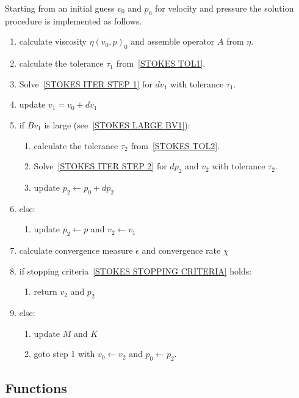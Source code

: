 Starting from an initial guess $v_{0}$ and $p_{0}$ for velocity and pressure
the solution procedure is implemented as follows.
\begin{enumerate}
 \item calculate viscosity $\eta(v_{0},p)_{0}$ and assemble operator $A$ from $\eta$.
 \item calculate the tolerance $\tau_{1}$ from~\ref{STOKES TOL1}.
 \item Solve~\ref{STOKES ITER STEP 1} for $dv_{1}$ with tolerance $\tau_{1}$.
 \item update $v_{1}= v_{0}+ dv_{1}$
 \item if $Bv_{1}$ is large (see~\ref{STOKES LARGE BV1}):
 \begin{enumerate}
 \item calculate the tolerance $\tau_{2}$ from~\ref{STOKES TOL2}.
 \item Solve~\ref{STOKES ITER STEP 2} for $dp_{2}$ and $v_{2}$ with tolerance $\tau_{2}$.
 \item update $p_{2}\leftarrow p_{0}+ dp_{2}$
 \end{enumerate}
 \item else:
  \begin{enumerate}
  \item update $p_{2}\leftarrow p$ and $v_{2}\leftarrow v_{1}$
   \end{enumerate}
   \item calculate convergence measure $\epsilon$ and convergence rate $\chi$
\item if stopping criteria~\ref{STOKES STOPPING CRITERIA} holds:
 \begin{enumerate}
 \item return $v_{2}$ and $p_{2}$
 \end{enumerate}
 \item else:
 \begin{enumerate}

     \item update $M$ and $K$
     \item goto step 1 with $v_{0}\leftarrow v_{2}$ and $p_{0}\leftarrow p_{2}$.
\end{enumerate}
\end{enumerate}

\subsection{Functions}

